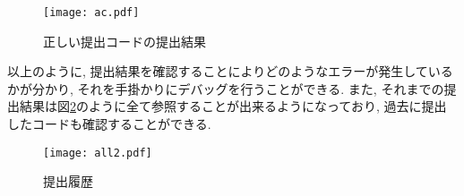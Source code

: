 \begin{figure}[H]
    \centering
    \texttt{[image: ac.pdf]}
    \caption{正しい提出コードの提出結果}
    \label{code:ac-sub}
\end{figure}

\clearpage
以上のように, 提出結果を確認することによりどのようなエラーが発生しているかが分かり, それを手掛かりにデバッグを行うことができる. 
また, それまでの提出結果は図\ref{pic:all}のように全て参照することが出来るようになっており, 過去に提出したコードも確認することができる. 

\begin{figure}[H]
    \centering
    \texttt{[image: all2.pdf]}
    \caption{提出履歴}
    \label{pic:all}
\end{figure}

